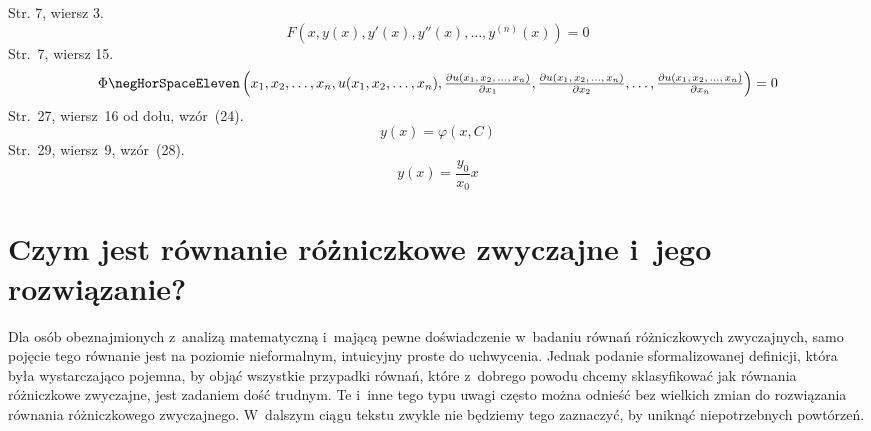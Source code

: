 \documentclass[a4paper,11pt]{article}
\numberwithin{equation}{section}
\begin{document}
\VerSpaceTwo


\noindent
Str. 7, wiersz 3.
\begin{equation}
  \label{eq:Uwagi-ogolne-04}
  F\left( x, y( x ), y'( x ), y''( x ), \ldots, y^{ ( n ) }( x ) \right) = 0
\end{equation}
Str.~7, wiersz 15.
\begin{equation}
  \label{eq:Uwagi-ogolne-05}
  \Phi \negHorSpaceEleven \left( x_{ 1 }, x_{ 2 }, \ldots, x_{ n },
    u( x_{ 1 }, x_{ 2 }, \ldots, x_{ n }),
    \tfrac{ \partial u( x_{ 1 }, \, x_{ 2 }, \, \ldots, \, x_{ n } ) }{ \partial x_{ 1 } },
    \tfrac{ \partial u( x_{ 1 }, \, x_{ 2 }, \, \ldots, \, x_{ n } ) }{ \partial x_{ 2 } }, \ldots,
    \tfrac{ \partial u( x_{ 1 }, \, x_{ 2 }, \, \ldots, \, x_{ n } ) }{ \partial x_{ n } }
  \right) = 0
\end{equation}
Str.~27, wiersz~16 od dołu, wzór~(24).
\begin{equation}
  \label{eq:Uwagi-ogolne-06}
  y( x ) = \varphi( x, C )
\end{equation}
Str.~29, wiersz~9, wzór~(28).
\begin{equation}
  \label{eq:Uwagi-ogolne-07}
  y( x ) = \frac{ y_{ 0 } }{ x_{ 0 } } x
\end{equation}










\section{Czym jest równanie różniczkowe zwyczajne i~jego
  rozwiązanie?}

\label{sec:Czym-jest-rownanie-ETC}



Dla osób obeznajmionych z~analizą matematyczną i~mającą pewne doświadczenie
w~badaniu równań różniczkowych zwyczajnych, samo pojęcie tego równanie jest
na poziomie nieformalnym, intuicyjny proste do uchwycenia.
Jednak podanie sformalizowanej definicji, która była wystarczająco pojemna,
by objąć wszystkie przypadki równań, które z~dobrego powodu chcemy
sklasyfikować jak równania różniczkowe zwyczajne, jest zadaniem dość trudnym.
Te i~inne tego typu uwagi często można odnieść bez wielkich zmian do
rozwiązania równania różniczkowego zwyczajnego. W~dalszym ciągu tekstu zwykle
nie będziemy tego zaznaczyć, by uniknąć niepotrzebnych powtórzeń.
\end{document}

